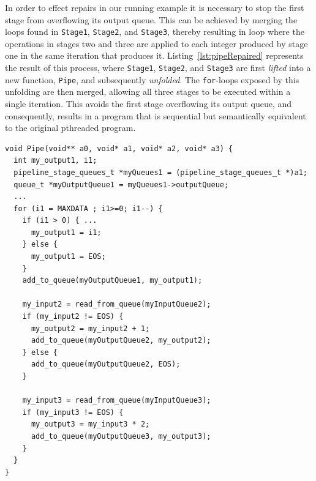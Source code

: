 In order to effect repairs in our running example it is necessary to stop the first stage from overflowing its output queue. This can be achieved by merging the loops found in \lstinline|Stage1|, \lstinline|Stage2|, and \lstinline|Stage3|, thereby resulting in loop where the operations in stages two and three are applied to each integer produced by stage one in the same iteration that produces it. Listing~\ref{lst:pipeRepaired} represents the result of this process, where \lstinline|Stage1|, \lstinline|Stage2|, and \lstinline|Stage3| are first \emph{lifted} into a new function, \lstinline|Pipe|, and subsequently \emph{unfolded}. The \lstinline|for|-loops exposed by this unfolding are then merged, allowing all three stages to be executed within a single iteration. This avoids the first stage overflowing its output queue, and consequently, results in a program that is sequential but semantically equivalent to the original pthreaded program.


\begin{lstlisting}[caption=Simple Pipeline Code after Code Repair, frame=single, label=lst:pipeRepaired]
void Pipe(void** a0, void* a1, void* a2, void* a3) {
  int my_output1, i1;
  pipeline_stage_queues_t *myQueues1 = (pipeline_stage_queues_t *)a1;
  queue_t *myOutputQueue1 = myQueues1->outputQueue;
  ...
  for (i1 = MAXDATA ; i1>=0; i1--) {
    if (i1 > 0) { ...
      my_output1 = i1;
    } else {
      my_output1 = EOS;
    }
    add_to_queue(myOutputQueue1, my_output1);

    my_input2 = read_from_queue(myInputQueue2);
    if (my_input2 != EOS) {
      my_output2 = my_input2 + 1;
      add_to_queue(myOutputQueue2, my_output2);
    } else {
      add_to_queue(myOutputQueue2, EOS);
    }

    my_input3 = read_from_queue(myInputQueue3);
    if (my_input3 != EOS) {
      my_output3 = my_input3 * 2;
      add_to_queue(myOutputQueue3, my_output3);
    }
  }
}
\end{lstlisting}



